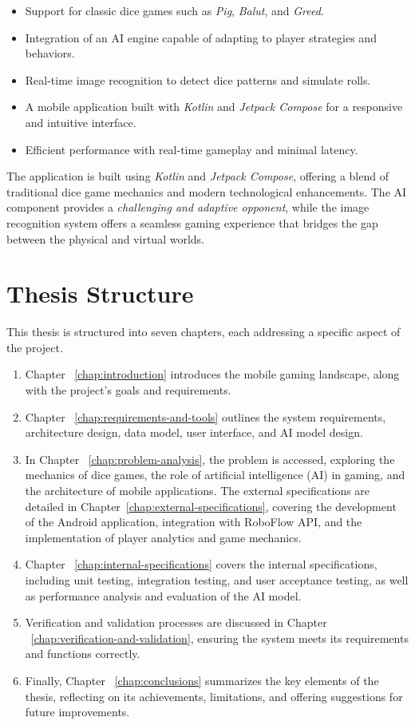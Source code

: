\begin{itemize}
    \item Support for classic dice games such as \emph{Pig}, \emph{Balut}, and \emph{Greed}.
    \item Integration of an AI engine capable of adapting to player strategies and behaviors.
    \item Real-time image recognition to detect dice patterns and simulate rolls.
    \item A mobile application built with \emph{Kotlin} and \emph{Jetpack Compose} for a responsive and intuitive interface.
    \item Efficient performance with real-time gameplay and minimal latency.
\end{itemize}

The application is built using \emph{Kotlin} and \emph{Jetpack Compose}, offering a blend of traditional dice game mechanics and modern technological enhancements. The AI component provides a \emph{challenging and adaptive opponent}, while the image recognition system offers a seamless gaming experience that bridges the gap between the physical and virtual worlds.

\section{Thesis Structure}
This thesis is structured into seven chapters, each addressing a specific aspect of the project.

\begin{enumerate}
    \item Chapter ~\ref{chap:introduction} introduces the mobile gaming landscape, along with the project's goals and requirements.
    \item Chapter ~\ref{chap:requirements-and-tools} outlines the system requirements, architecture design, data model, user interface, and AI model design.
    \item In Chapter ~\ref{chap:problem-analysis}, the problem is accessed, exploring the mechanics of dice games, the role of artificial intelligence (AI) in gaming, and the architecture of mobile applications.
    The external specifications are detailed in Chapter~\ref{chap:external-specifications}, covering the development of the Android application, integration with RoboFlow API, and the implementation of player analytics and game mechanics.
    \item Chapter ~\ref{chap:internal-specifications} covers the internal specifications, including unit testing, integration testing, and user acceptance testing, as well as performance analysis and evaluation of the AI model.
    \item Verification and validation processes are discussed in Chapter ~\ref{chap:verification-and-validation}, ensuring the system meets its requirements and functions correctly.
    \item Finally, Chapter ~\ref{chap:conclusions} summarizes the key elements of the thesis, reflecting on its achievements, limitations, and offering suggestions for future improvements.
\end{enumerate}
